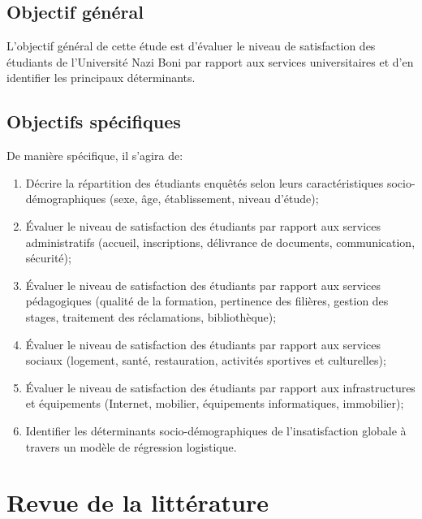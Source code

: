 \documentclass[
12pt,          %
a4paper,       %
oneside,      %
openright      %
]{report}          %
\begin{document}
		\subsection{Objectif général}
		L'objectif général de cette étude est d'évaluer le niveau de satisfaction des étudiants
		de l'Université Nazi Boni par rapport aux services universitaires et d'en identifier les
		principaux déterminants.
		
		\subsection{Objectifs spécifiques}
		De manière spécifique, il s'agira de:
		\begin{enumerate}
			\item Décrire la répartition des étudiants enquêtés selon leurs caractéristiques
			socio-démographiques (sexe, âge, établissement, niveau d'étude);
			\item Évaluer le niveau de satisfaction des étudiants par rapport aux services
			administratifs (accueil, inscriptions, délivrance de documents, communication,
			sécurité);
			\item Évaluer le niveau de satisfaction des étudiants par rapport aux services
			pédagogiques (qualité de la formation, pertinence des filières, gestion des stages,
			traitement des réclamations, bibliothèque);
			\item Évaluer le niveau de satisfaction des étudiants par rapport aux services sociaux
			(logement, santé, restauration, activités sportives et culturelles);
			\item Évaluer le niveau de satisfaction des étudiants par rapport aux infrastructures
			et équipements (Internet, mobilier, équipements informatiques, immobilier);
			\item Identifier les déterminants socio-démographiques de l'insatisfaction globale à
			travers un modèle de régression logistique.
		\end{enumerate}
		
		
		
		\section{Revue de la littérature}
		\label{sec:revue}
\end{document}
